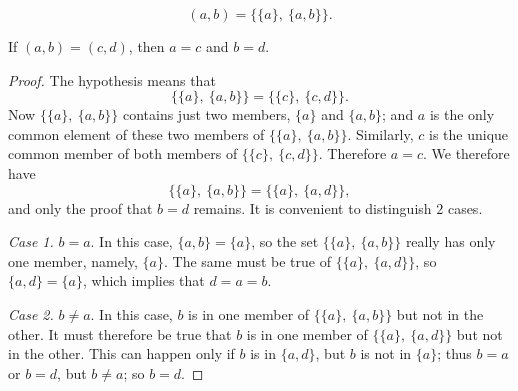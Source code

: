 \begin{spivakdefn}
\[
(a,b) = \bigl\{\{a\},\ \{a,b\}\bigr\}.
\]
\end{spivakdefn}

\begin{theorem}
If $(a,b)=(c,d)$, then $a=c$ and $b=d$.
\end{theorem}

\begin{proof}
The hypothesis means that
\[
\bigl\{\{a\},\ \{a,b\}\bigr\} = \bigl\{\{c\},\ \{c,d\}\bigr\}.
\]
Now $\{\{a\},\ \{a,b\}\}$ contains just two members, $\{a\}$ and $\{a,b\}$;
and $a$ is the only common element of these two members of
$\{\{a\},\ \{a,b\}\}$. Similarly, $c$ is the unique common member of both
members of $\{\{c\},\ \{c,d\}\}$. Therefore $a=c$. We therefore have
\[
\bigl\{\{a\},\ \{a,b\}\bigr\} = \bigl\{\{a\},\ \{a,d\}\bigr\},
\]
and only the proof that $b=d$ remains. It is convenient to distinguish $2$
cases.

\textit{Case 1.} $b=a$. In this case, $\{a,b\}=\{a\}$, so the set
$\{\{a\},\ \{a,b\}\}$ really has only one member, namely, $\{a\}$. The same
must be true of $\{\{a\},\ \{a,d\}\}$, so $\{a,d\}=\{a\}$, which implies that
$d=a=b$.

\textit{Case 2.} $b \neq a$. In this case, $b$ is in one member of
$\{\{a\},\ \{a,b\}\}$ but not in the other. It must therefore be true that $b$
is in one member of $\{\{a\},\ \{a,d\}\}$ but not in the other. This can
happen only if $b$ is in $\{a,d\}$, but $b$ is not in $\{a\}$; thus $b=a$ or
$b=d$, but $b \neq a$; so $b=d$.
\end{proof}

